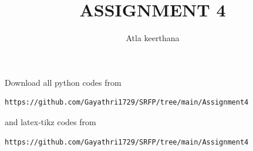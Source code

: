 \documentclass[journal,12pt,twocolumn]{IEEEtran}
\begin{document}
%


\newtheorem{theorem}{Theorem}[section]
\newtheorem{problem}{Problem}
\newtheorem{proposition}{Proposition}[section]
\newtheorem{lemma}{Lemma}[section]
\newtheorem{corollary}[theorem]{Corollary}
\newtheorem{example}{Example}[section]
\newtheorem{definition}[problem]{Definition}
\newcommand{\BEQA}{\begin{eqnarray}}
\newcommand{\EEQA}{\end{eqnarray}}
\newcommand{\define}{\stackrel{\triangle}{=}}

\providecommand{\mbf}{\mathbf}
\providecommand{\pr}[1]{\ensuremath{\Pr\left(#1\right)}}
\providecommand{\qfunc}[1]{\ensuremath{Q\left(#1\right)}}
\providecommand{\sbrak}[1]{\ensuremath{{}\left[#1\right]}}
\providecommand{\lsbrak}[1]{\ensuremath{{}\left[#1\right.}}
\providecommand{\rsbrak}[1]{\ensuremath{{}\left.#1\right]}}
\providecommand{\brak}[1]{\ensuremath{\left(#1\right)}}
\providecommand{\lbrak}[1]{\ensuremath{\left(#1\right.}}
\providecommand{\rbrak}[1]{\ensuremath{\left.#1\right)}}
\providecommand{\cbrak}[1]{\ensuremath{\left\{#1\right\}}}
\providecommand{\lcbrak}[1]{\ensuremath{\left\{#1\right.}}
\providecommand{\rcbrak}[1]{\ensuremath{\left.#1\right\}}}
\theoremstyle{remark}
\newtheorem{rem}{Remark}
\newcommand{\sgn}{\mathop{\mathrm{sgn}}}
\providecommand{\abs}[1]{\left\vert#1\right\vert}
\providecommand{\res}[1]{\Res\displaylimits_{#1}} 
\providecommand{\norm}[1]{\left\lVert#1\right\rVert}
\providecommand{\mtx}[1]{\mathbf{#1}}
\providecommand{\mean}[1]{E\left[ #1 \right]}
\providecommand{\fourier}{\overset{\mathcal{F}}{ \rightleftharpoons}}
\providecommand{\system}{\overset{\mathcal{H}}{ \longleftrightarrow}}
\newcommand{\myvec}[1]{\ensuremath{\begin{pmatrix}#1\end{pmatrix}}}
\newcommand{\cmyvec}[1]{\ensuremath{\begin{pmatrix*}[c]#1\end{pmatrix*}}}
\newcommand{\mydet}[1]{\ensuremath{\begin{vmatrix}#1\end{vmatrix}}}
\newcommand{\proj}[2]{\textbf{proj}_{\vec{#1}}\vec{#2}}
\let\StandardTheFigure\thefigure
\let\vec\mathbf
\title{
ASSIGNMENT 4
}
\author{Atla keerthana}
	
\maketitle
\renewcommand{\thefigure}{\theenumi}
\renewcommand{\thetable}{\theenumi}
  Download all python codes from 
\begin{lstlisting}
https://github.com/Gayathri1729/SRFP/tree/main/Assignment4
\end{lstlisting}
%
and latex-tikz codes from 
%
\begin{lstlisting}
https://github.com/Gayathri1729/SRFP/tree/main/Assignment4
\end{lstlisting}
%
\end{document}

